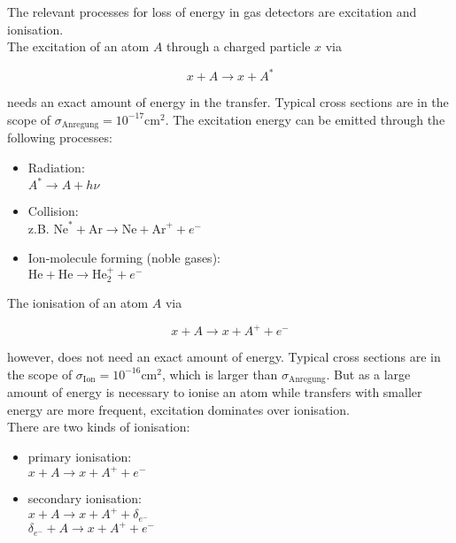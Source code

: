The relevant processes for loss of energy in gas detectors are excitation and ionisation. 
\\
The excitation of an atom $A$ through a charged particle $x$ via

\[x+A \longrightarrow x+ A^*\]

needs an exact amount of energy in the transfer. Typical cross sections are in the scope of
$\sigma_{\text{Anregung}}=10^{-17}\text{cm}^2$. The excitation energy can be emitted through the
following processes:

\begin{itemize}
  \item Radiation:\\ $A^*\longrightarrow A+h\nu$
  \item Collision:\\ z.B. $\text{Ne}^*+\text{Ar}\longrightarrow \text{Ne}+\text{Ar}^++e^-$
  \item Ion-molecule forming (noble gases):\\ $\text{He}+\text{He} \longrightarrow\text{He}^+_2+e^-$
\end{itemize}

The ionisation of an atom $A$ via

\[x+A \longrightarrow x+ A^+ +e^- \]

however, does not need an exact amount of energy. Typical cross sections are in the scope of
$\sigma_{\text{Ion}}=10^{-16}\text{cm}^2$, which is larger than $\sigma_{\text{Anregung}}$. But as a
large amount of energy is necessary to ionise an atom while transfers with smaller energy are more
frequent, excitation dominates over ionisation.
\\
There are two kinds of ionisation: 

\begin{itemize}
  \item primary ionisation:\\ $x+A \longrightarrow x+A^++e^-$
  \item secondary ionisation:\\ $x+A \longrightarrow x+A^++\delta_{e^-}$ \\ $\delta_{e^-}+A
  \longrightarrow x+A^++e^-$
\end{itemize}

